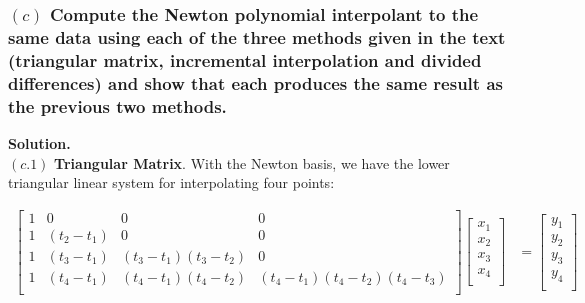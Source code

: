 \subsubsection*{$(c)$ Compute the Newton polynomial interpolant to the same data using each of the three methods given in the text (triangular matrix, incremental interpolation and divided differences) and show that each produces the same result as the previous two methods.}
\textbf{Solution.}\\
$(c.1)$ \textbf{Triangular Matrix}. With the Newton basis, we have the lower triangular linear system for interpolating four points:

\begin{align*}
\begin{bmatrix}
1 & 0 & 0 & 0 \\
1 & (t_2-t_1) & 0 & 0 \\
1 & (t_3-t_1) & (t_3-t_1)(t_3-t_2) & 0 \\
1 & (t_4-t_1) & (t_4-t_1)(t_4-t_2) & (t_4-t_1)(t_4-t_2)(t_4-t_3) \\
\end{bmatrix}
\begin{bmatrix}
x_1 \\
x_2 \\
x_3 \\
x_4 \\
\end{bmatrix}
&=
\begin{bmatrix}
y_1 \\
y_2 \\
y_3 \\
y_4 \\
\end{bmatrix}
\end{align*}

